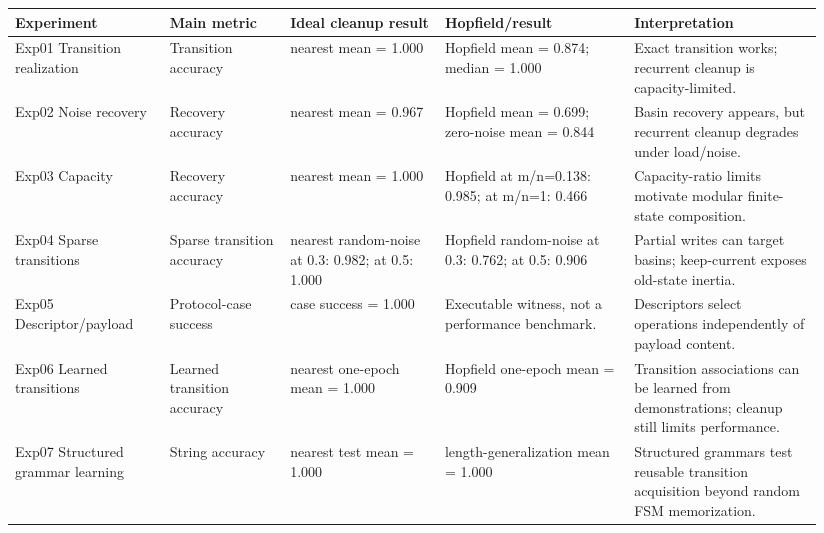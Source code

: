 \begin{tabular}{p{0.18\linewidth} p{0.14\linewidth} p{0.18\linewidth} p{0.22\linewidth} p{0.22\linewidth}}
\hline
Experiment & Main metric & Ideal cleanup result & Hopfield/result & Interpretation \\
\hline
Exp01 Transition realization & Transition accuracy & nearest mean = 1.000 & Hopfield mean = 0.874; median = 1.000 & Exact transition works; recurrent cleanup is capacity-limited. \\
Exp02 Noise recovery & Recovery accuracy & nearest mean = 0.967 & Hopfield mean = 0.699; zero-noise mean = 0.844 & Basin recovery appears, but recurrent cleanup degrades under load/noise. \\
Exp03 Capacity & Recovery accuracy & nearest mean = 1.000 & Hopfield at m/n=0.138: 0.985; at m/n=1: 0.466 & Capacity-ratio limits motivate modular finite-state composition. \\
Exp04 Sparse transitions & Sparse transition accuracy & nearest random-noise at 0.3: 0.982; at 0.5: 1.000 & Hopfield random-noise at 0.3: 0.762; at 0.5: 0.906 & Partial writes can target basins; keep-current exposes old-state inertia. \\
Exp05 Descriptor/payload & Protocol-case success & case success = 1.000 & Executable witness, not a performance benchmark. & Descriptors select operations independently of payload content. \\
Exp06 Learned transitions & Learned transition accuracy & nearest one-epoch mean = 1.000 & Hopfield one-epoch mean = 0.909 & Transition associations can be learned from demonstrations; cleanup still limits performance. \\
Exp07 Structured grammar learning & String accuracy & nearest test mean = 1.000 & length-generalization mean = 1.000 & Structured grammars test reusable transition acquisition beyond random FSM memorization. \\
\hline
\end{tabular}
